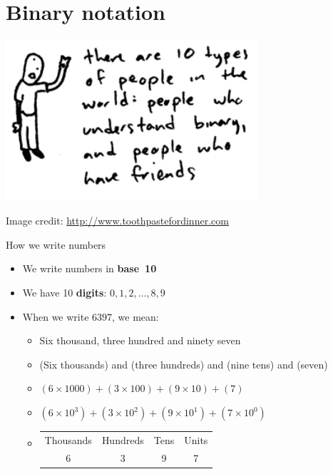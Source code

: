 \part{Binary notation}
\frame{\partpage}

\begin{frame}
	\centering
	\includegraphics[width=0.7\textwidth]{10-types-of-people}
	\par\vspace{2ex}\par
	{\tiny Image credit: \url{http://www.toothpastefordinner.com}}
\end{frame}

\begin{frame}{How we write numbers}
	\begin{itemize}
		\pause\item We write numbers in \textbf{base~10}
		\pause\item We have 10 \textbf{digits}: $0, 1, 2, \dots, 8, 9$
		\pause\item When we write $6397$, we mean:
			\begin{itemize}
				\pause\item Six thousand, three hundred and ninety seven
				\pause\item (Six thousands) and (three hundreds) and (nine tens) and (seven)
				\pause\item $(6 \times 1000) + (3 \times 100) + (9 \times 10) + (7)$
				\pause\item $\left(6 \times 10^3\right)
				+ \left(3 \times 10^2\right)
				+ \left(9 \times 10^1\right)
				+ \left(7 \times 10^0\right)$
				\pause\item
				    \begin{tabular}{cccc}
				        Thousands & Hundreds & Tens & Units \\
				        6 & 3 & 9 & 7
				    \end{tabular}
			\end{itemize}
	\end{itemize}
\end{frame}

